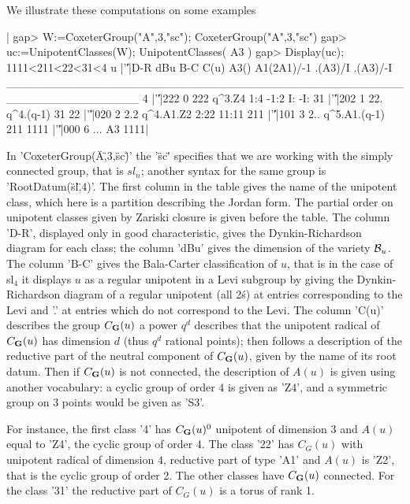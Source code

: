 We illustrate these computations on some examples\:

|    gap> W:=CoxeterGroup("A",3,"sc");
    CoxeterGroup("A",3,"sc")
    gap> uc:=UnipotentClasses(W);
    UnipotentClasses( A3 )
    gap> Display(uc);
    1111<211<22<31<4
       u |'\|'|D-R dBu B-C         C(u) A3() A1(2A1)/-1 .(A3)/I .(A3)/-I
    ________________________________________________________________
    4    |'\|'|222   0 222       q^3.Z4  1:4       -1:2      I:      -I:
    31   |'\|'|202   1 22.    q^4.(q-1)   31                            
    22   |'\|'|020   2 2.2    q^4.A1.Z2 2:22      11:11                 
    211  |'\|'|101   3 2.. q^5.A1.(q-1)  211                            
    1111 |'\|'|000   6 ...           A3 1111|

In  'CoxeterGroup(\"A\",3,\"sc\")'  the  '\"sc\"'  specifies  that  we  are
working with the simply connected group, that is $sl_n$; another syntax for
the  same group  is 'RootDatum(\"sl\",4)'.  The first  column in  the table
gives the name of the unipotent class, which here is a partition describing
the  Jordan form. The  partial order on  unipotent classes given by Zariski
closure is given before the table. The column 'D-R', displayed only in good
characteristic,  gives the  Dynkin-Richardson diagram  for each  class; the
column  'dBu' gives the dimension of  the variety ${\mathcal B}_u$. The column 'B-C'
gives  the Bala-Carter classification of $u$, that is in the case of sl$_4$
it  displays $u$ as  a regular unipotent  in a Levi  subgroup by giving the
Dynkin-Richardson  diagram  of  a  regular  unipotent (all 2\'s) at entries
corresponding to the Levi and '.' at entries which do not correspond to the
Levi.  The column  'C(u)' describes  the group  $C_{\bf G}(u)$\: a  power $q^d$
describes  that the unipotent radical of $C_{\bf G}(u)$ has dimension $d$ (thus
$q^d$ rational points); then follows a description of the reductive part of
the  neutral component of $C_{\bf G}(u)$, given by  the name of its root datum.
Then  if $C_{\bf G}(u)$  is not  connected, the  description of $A(u)$ is given
using another vocabulary: a cyclic group of order 4 is given as 'Z4', and a
symmetric group on 3 points would be given as 'S3'.

For  instance, the first class '4'  has $C_{\bf G}(u)^0$ unipotent of dimension
$3$  and $A(u)$ equal to 'Z4', the cyclic  group of order 4. The class '22'
has  $C_G(u)$ with  unipotent radical  of dimension  $4$, reductive part of
type  'A1' and  $A(u)$ is  'Z2', that  is the  cyclic group of order 2. The
other  classes have $C_{\bf G}(u)$ connected. For  the class '31' the reductive
part of $C_G(u)$ is a torus of rank 1.

